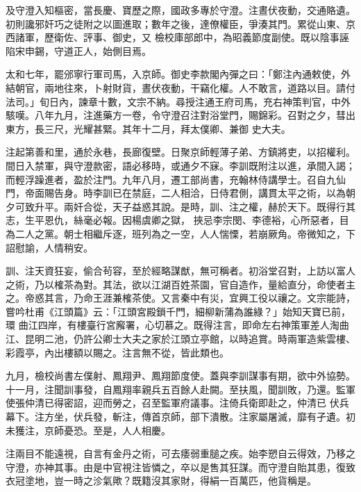 \begin{pinyinscope}
 及守澄入知樞密，當長慶、寶歷之際，國政多專於守澄。注晝伏夜動，交通賂遺。初則讒邪奸巧之徒附之以圖進取；數年之後，達僚權臣，爭湊其門。累從山東、京西諸軍，歷衛佐、評事、御史，又
 檢校庫部郎中，為昭義節度副使。既以陰事誣陷宋申錫，守道正人，始側目焉。



 太和七年，罷邠寧行軍司馬，入京師。御史李款閣內彈之曰：「鄭注內通敕使，外結朝官，兩地往來，卜射財貨，晝伏夜動，干竊化權。人不敢言，道路以目。請付法司。」旬日內，諫章十數，文宗不納。尋授注通王府司馬，充右神策判官，中外駭嘆。八年九月，注進藥方一卷，令守澄召注對浴堂門，賜錦彩。召對之夕，彗出東方，長三尺，光耀甚緊。其年十二月，拜太僕卿、兼御
 史大夫。



 注起第善和里，通於永巷，長廊復壁。日聚京師輕薄子弟、方鎮將吏，以招權利。間日入禁軍，與守澄款密，語必移時，或通夕不寐。李訓既附注以進，承間入謁；而輕浮躁進者，盈於注門。九年八月，遷工部尚書，充翰林侍講學士。召自九仙門，帝面賜告身。時李訓已在禁庭，二人相洽，日侍君側，講貫太平之術，以為朝夕可致升平。兩奸合從，天子益惑其說。是時，訓、注之權，赫於天下。既得行其志，生平恩仇，絲毫必報。因楊虞卿之獄，
 挾忌李宗閔、李德裕，心所惡者，目為二人之黨。朝士相繼斥逐，班列為之一空，人人惴慄，若崩厥角。帝微知之，下詔慰諭，人情稍安。



 訓、注天資狂妄，偷合茍容，至於經略謀猷，無可稱者。初浴堂召對，上訪以富人之術，乃以榷茶為對。其法，欲以江湖百姓茶園，官自造作，量給直分，命使者主之。帝惑其言，乃命王涯兼榷茶使。又言秦中有災，宜興工役以禳之。文宗能詩，嘗吟杜甫《江頭篇》云：「江頭宮殿鎖千門，細柳新蒲為誰綠？」始知天寶已前，環
 曲江四岸，有樓臺行宮廨署，心切慕之。既得注言，即命左右神策軍差人淘曲江、昆明二池，仍許公卿士大夫之家於江頭立亭館，以時追賞。時兩軍造紫雲樓、彩霞亭，內出樓額以賜之。注言無不從，皆此類也。



 九月，檢校尚書左僕射、鳳翔尹、鳳翔節度使。蓋與李訓謀事有期，欲中外協勢。十一月，注聞訓事發，自鳳翔率親兵五百餘人赴闕。至扶風，聞訓敗，乃還。監軍使張仲清已得密詔，迎而勞之，召至監軍府議事。注倚兵衛即赴之，仲清已
 伏兵幕下。注方坐，伏兵發，斬注，傳首京師，部下潰散。注家屬屠滅，靡有孑遺。初未獲注，京師憂恐。至是，人人相慶。



 注兩目不能遠視，自言有金丹之術，可去痿弱重膇之疾。始李愬自云得效，乃移之守澄，亦神其事。由是中官視注皆憐之，卒以是售其狂謀。而守澄自貽其患，復致衣冠塗地，豈一時之沴氣歟？既籍沒其家財，得絹一百萬匹，他貨稱是。




\end{pinyinscope}

